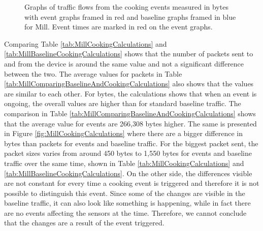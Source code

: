 \begin{figure}[H]
\begin{subfigure}[b]{0.47\textwidth}
    \end{subfigure}
        \begin{subfigure}[b]{0.47\textwidth}
        \centering
    \end{subfigure}
    \begin{subfigure}[b]{0.47\textwidth}
        \centering
    \end{subfigure}
    \begin{subfigure}[b]{0.47\textwidth}
        \centering
    \end{subfigure}
    \hspace{0.6cm}
    \begin{subfigure}[b]{0.47\textwidth}
    \centering
        \end{subfigure}
    \caption{Graphs of traffic flows from the cooking events measured in bytes with event graphs framed in red and baseline graphs framed in blue for Mill. Event times are marked in red on the event graphs.} 
    \label{fig:MillCookingBytes2}
\end{figure}

Comparing Table \ref{tab:MillCookingCalculations} and \ref{tab:MillBaselineCookingCalculations} shows that the number of packets sent to and from the device is around the same value and not a significant difference between the two. The average values for packets in Table \ref{tab:MillComparingBaselineAndCookingCalculations} also shows that the values are similar to each other. For bytes, the calculations shows that when an event is ongoing, the overall values are higher than for standard baseline traffic. The comparison in Table \ref{tab:MillComparingBaselineAndCookingCalculations} shows that the average value for events are 266,308 bytes higher. The same is presented in Figure \ref{fig:MillCookingCalculations} where there are a bigger difference in bytes than packets for events and baseline traffic. For the biggest packet sent, the packet sizes varies from around 450 bytes to 1,550 bytes for events and baseline traffic over the same time, shown in Table \ref{tab:MillCookingCalculations} and \ref{tab:MillBaselineCookingCalculations}. On the other side, the differences visible are not constant for every time a cooking event is triggered and therefore it is not possible to distinguish this event. Since some of the changes are visible in the baseline traffic, it can also look like something is happening, while in fact there are no events affecting the sensors at the time. Therefore, we cannot conclude that the changes are a result of the event triggered. 

